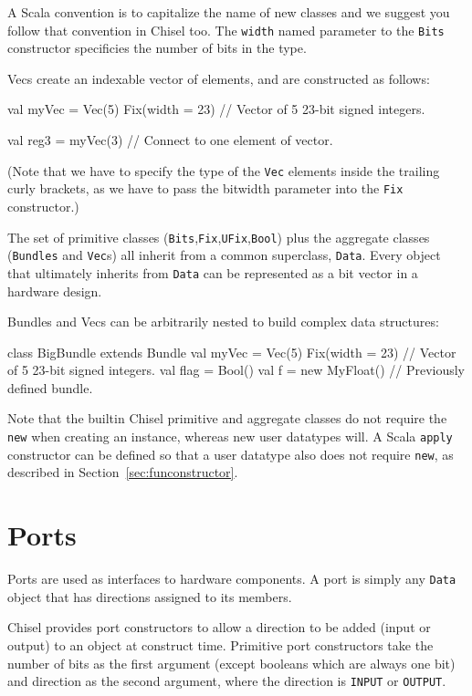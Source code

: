 \documentclass[10pt]{article}
\def\code#1{{\tt #1}}
\begin{document}
\noindent
A Scala convention is to capitalize the name of new classes and we
suggest you follow that convention in Chisel too.  The \code{width}
named parameter to the \code{Bits} constructor specificies the number
of bits in the type.

Vecs create an indexable vector of elements, and are constructed as
follows:
\begin{scala}
val myVec = Vec(5) { Fix(width = 23) } // Vector of 5 23-bit signed integers.

val reg3  = myVec(3) // Connect to one element of vector.
\end{scala}

\noindent
(Note that we have to specify the type of the \code{Vec} elements
inside the trailing curly brackets, as we have to pass the bitwidth
parameter into the \code{Fix} constructor.)

The set of primitive classes
(\code{Bits},\code{Fix},\code{UFix},\code{Bool}) plus the aggregate
classes (\code{Bundles} and \code{Vec}s) all inherit from a common
superclass, \code{Data}.  Every object that ultimately inherits from
\code{Data} can be represented as a bit vector in a hardware design.

Bundles and Vecs can be arbitrarily nested to build complex data
structures:
\begin{scala}
class BigBundle extends Bundle {
 val myVec = Vec(5) { Fix(width = 23) } // Vector of 5 23-bit signed integers.
 val flag  = Bool()
 val f     = new MyFloat()              // Previously defined bundle.
}
\end{scala}

\noindent
Note that the builtin Chisel primitive and aggregate classes do not
require the \code{new} when creating an instance, whereas new user
datatypes will.  A Scala \code{apply} constructor can be defined so
that a user datatype also does not require \code{new}, as described in
Section~\ref{sec:funconstructor}.

\section{Ports}

Ports are used as interfaces to hardware components.  A port is simply
any \code{Data} object that has directions assigned to its members.

Chisel provides port constructors to allow a direction to be added
(input or output) to an object at construct time.  Primitive port
constructors take the number of bits as the first argument (except
booleans which are always one bit) and direction as the second
argument, where the direction is \code{INPUT} or
\code{OUTPUT}.
\end{document}
